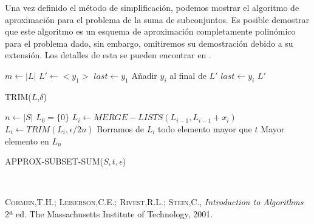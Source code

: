 \documentclass{article}
\begin{document}
Una vez definido el método de simplificación, podemos mostrar el algoritmo de aproximación para el problema de la suma de subconjuntos. Es posible demostrar que este algoritmo es un esquema de aproximación completamente polinómico para el problema dado, sin embargo, omitiremos su demostración debido a su extensión. Los detalles de esta se pueden encontrar en \cite[pág 1132]{cormen}.\\

\begin{algorithm}[H]
\begin{algorithmic}[1]
\STATE $m \gets |L|$
\STATE $L' \gets <y_1>$
\STATE $last \gets y_1$
\STATE Añadir $y_i$ al final de $L'$
\STATE $last \gets y_i$
\ENDIF
\ENDFOR
\RETURN $L'$
\end{algorithmic}
\caption{TRIM($L$,$\delta$)}
\end{algorithm}

\begin{algorithm}[H]
\begin{algorithmic}[1]
\STATE $n \gets |S|$
\STATE	 $L_0 = \{0\} $
\STATE $L_i \gets MERGE-LISTS(L_{i-1}, L_{i-1} + x_i)$
\STATE $L_i \gets TRIM(L_i, \epsilon/2n)$
\STATE Borramos de $L_i$ todo elemento mayor que $t$
\ENDFOR
\RETURN Mayor elemento en $L_n$
\end{algorithmic}
\caption{APPROX-SUBSET-SUM($S,t,\epsilon$)}
\end{algorithm}

\\

\begin{thebibliography}{x}
 \textsc{Cormen,T.H.; Leiserson,C.E.; Rivest,R.L.; Stein,C.},
\textit{Introduction to Algorithms}
2ª ed. The Massachusetts Institute of Technology, 2001. 

\end{thebibliography}
\end{document}
